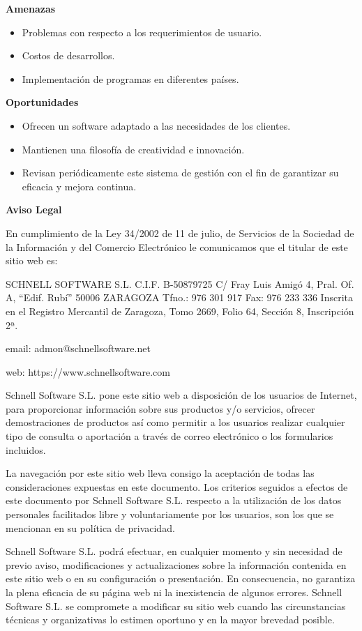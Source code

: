 \documentclass[10pt,a4paper]{article}
\begin{document}
\begin{enumerate}
\textbf{Amenazas}

\begin{itemize}
\item Problemas con respecto a los requerimientos de usuario.
\item Costos de desarrollos.
\item Implementación de programas en diferentes países.
\end{itemize}

\textbf{Oportunidades}

\begin{itemize}
\item Ofrecen un software adaptado a las necesidades de los clientes.
\item Mantienen una filosofía de creatividad e innovación. 
\item Revisan periódicamente este sistema de gestión con el fin de garantizar su eficacia y mejora continua.
\end{itemize}

\textbf{Aviso Legal}

En cumplimiento de la Ley 34/2002 de 11 de julio, de Servicios de la Sociedad de la Información y del Comercio Electrónico le comunicamos que el titular de este sitio web es:

SCHNELL SOFTWARE S.L.
C.I.F. B-50879725
C/ Fray Luis Amigó 4, Pral. Of. A, “Edif. Rubí”
50006 ZARAGOZA
Tfno.: 976 301 917 Fax: 976 233 336
Inscrita en el Registro Mercantil de Zaragoza, Tomo 2669, Folio 64, Sección 8, Inscripción 2ª.

email: admon@schnellsoftware.net

web: https://www.schnellsoftware.com

Schnell Software S.L. pone este sitio web a disposición de los usuarios de Internet, para proporcionar información sobre sus productos y/o servicios, ofrecer demostraciones de productos así como permitir a los usuarios realizar cualquier tipo de consulta o aportación a través de correo electrónico o los formularios incluidos.

La navegación por este sitio web lleva consigo la aceptación de todas las consideraciones expuestas en este documento.
Los criterios seguidos a efectos de este documento por Schnell Software S.L. respecto a la utilización de los datos personales facilitados libre y voluntariamente por los usuarios, son los que se mencionan en su política de privacidad.

Schnell Software S.L. podrá efectuar, en cualquier momento y sin necesidad de previo aviso, modificaciones y actualizaciones sobre la información contenida en este sitio web o en su configuración o presentación. En consecuencia, no garantiza la plena eficacia de su página web ni la inexistencia de algunos errores. Schnell Software S.L. se compromete a modificar su sitio web cuando las circunstancias técnicas y organizativas lo estimen oportuno y en la mayor brevedad posible.


\end{enumerate}
\end{document}
